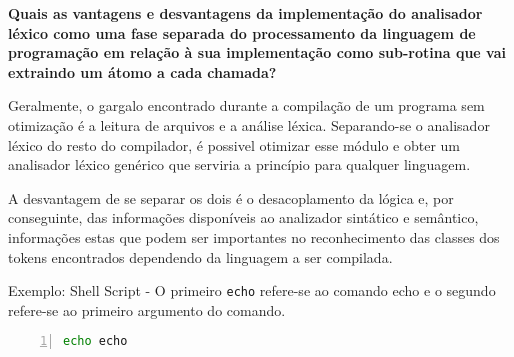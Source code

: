 
\textbf{Quais as vantagens e desvantagens da implementação do analisador léxico como uma fase separada do processamento da linguagem de programação em relação à sua implementação como sub-rotina que vai extraindo um átomo a cada chamada?}

Geralmente, o gargalo encontrado durante a compilação de um programa sem
otimização é a leitura de arquivos e a análise léxica. Separando-se o
analisador léxico do resto do compilador, é possivel otimizar esse módulo e
obter um analisador léxico genérico que serviria a princípio para qualquer
linguagem.

A desvantagem de se separar os dois é o desacoplamento da lógica e, por
conseguinte, das informações disponíveis ao analizador sintático e semântico,
informações estas que podem ser importantes no reconhecimento das classes dos
tokens encontrados dependendo da linguagem a ser compilada.

Exemplo: Shell Script - O primeiro \verb!echo! refere-se ao comando echo e o
segundo refere-se ao primeiro argumento do comando.

\begin{lstlisting}[frame=single,language=bash,numbers=left]
    echo echo
\end{lstlisting}

